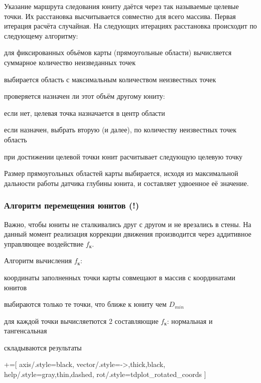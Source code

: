 Указание маршрута следования юниту даётся через так называемые целевые точки.
Их расстановка высчитывается совместно для всего массива. Первая итерация расчёта
случайная. На следующих итерациях расстановка происходит по следующему алгоритму:
\begin{mintemize}
\item для фиксированных объёмов карты (прямоугольные области) вычисляется суммарное
    количество неизведанных точек
\item выбирается область с максимальным количеством неизвестных точек
\item проверяется назначен ли этот объём другому юниту:
    \begin{mintemize}
        \item если нет, целевая точка назначается в центр области
        \item если назначен, выбрать вторую (и далее), по количеству неизвестных точек область
    \end{mintemize}
\item при достижении целевой точки юнит расчитывает следующую целевую точку
\end{mintemize}

Размер прямоугольных областей карты выбирается, исходя из максимальной дальности работы
датчика глубины юнита, и составляет удвоенное её значение.

\newpage
\subsubsection{Алгоритм перемещения юнитов (!)}

Важно, чтобы юниты не сталкивались друг с другом и не врезались в стены.
На данный момент реализация коррекции движения производится через аддитивное управляющее
воздействие $f_{\text{к}}$. 

Алгоритм вычисления $f_{\text{к}}$:
\begin{mintemize}
\item координаты заполненных точки карты совмещают в массив с координатами юнитов
\item выбираются только те точки, что ближе к юниту чем $D_{min}$
\item для каждой точки вычисляетются 2 составляющие $f_{\text{к}}$: нормальная и тангенсальная
\item складываются результаты
\end{mintemize}

+=[
    axis/.style={black},
    vector/.style={->,thick,black},
    help/.style={gray,thin,dashed},
    rot/.style={tdplot_rotated_coords}
]

